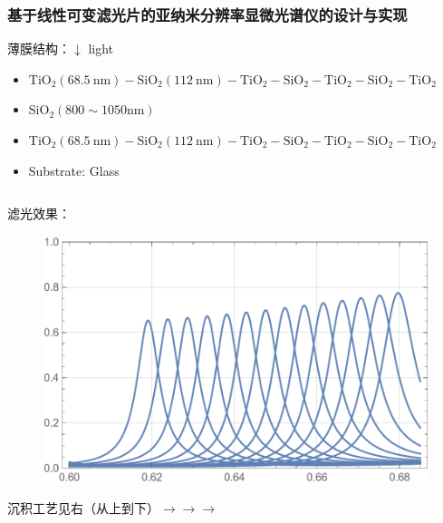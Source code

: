 \begin{frame}[c]
    \frametitle{基于线性可变滤光片的亚纳米分辨率显微光谱仪的设计与实现}
    薄膜结构：$\downarrow$ light
    \begin{itemize}
        \item $\mathrm{TiO}_2(68.5\ \text{nm})-\mathrm{SiO}_2(112\ \text{nm})-\mathrm{TiO}_2-\mathrm{SiO}_2-\mathrm{TiO}_2-\mathrm{SiO}_2-\mathrm{TiO}_2$
        \item $\mathrm{SiO}_2(800 \sim 1050 \text{nm})$
        \item $\mathrm{TiO}_2(68.5\ \text{nm})-\mathrm{SiO}_2(112\ \text{nm})-\mathrm{TiO}_2-\mathrm{SiO}_2-\mathrm{TiO}_2-\mathrm{SiO}_2-\mathrm{TiO}_2$
        \item Substrate: Glass
    \end{itemize}
    \begin{columns}
        \begin{column}{.5\textwidth}
            滤光效果：
            \begin{figure}[H] %
                \centering %
                \includegraphics[width=1.\textwidth]{figures/Design and implementation of a sub-nm resolution microspectrometer based on a Linear-Variable Optical Filter_3.png} %
            \end{figure}
            沉积工艺见右（从上到下）$\rightarrow\rightarrow\rightarrow$


\end{column}
\end{columns}
\end{frame}

